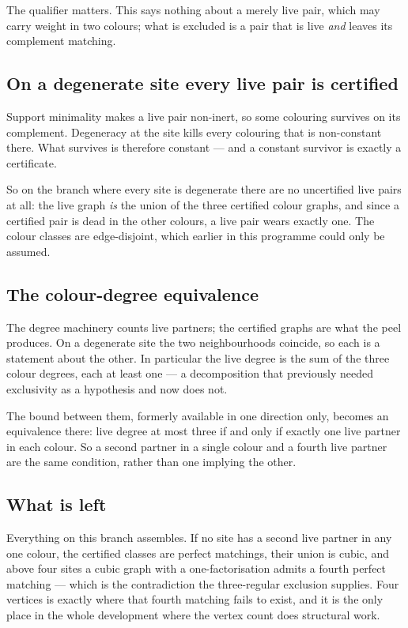 \documentclass[11pt]{article}
\theoremstyle{definition}
\theoremstyle{remark}
\begin{document}
The qualifier matters. This says nothing about a merely live pair, which may carry weight in two
colours; what is excluded is a pair that is live \emph{and} leaves its complement matching.

\subsection*{On a degenerate site every live pair is certified}

Support minimality makes a live pair non-inert, so some colouring survives on its complement.
Degeneracy at the site kills every colouring that is non-constant there. What survives is
therefore constant --- and a constant survivor is exactly a certificate.

So on the branch where every site is degenerate there are no uncertified live pairs at all: the
live graph \emph{is} the union of the three certified colour graphs, and since a certified pair is
dead in the other colours, a live pair wears exactly one. The colour classes are edge-disjoint,
which earlier in this programme could only be assumed.

\subsection*{The colour-degree equivalence}

The degree machinery counts live partners; the certified graphs are what the peel produces. On a
degenerate site the two neighbourhoods coincide, so each is a statement about the other. In
particular the live degree is the sum of the three colour degrees, each at least one --- a
decomposition that previously needed exclusivity as a hypothesis and now does not.

The bound between them, formerly available in one direction only, becomes an equivalence there:
live degree at most three if and only if exactly one live partner in each colour. So a second
partner in a single colour and a fourth live partner are the same condition, rather than one
implying the other.

\subsection*{What is left}

Everything on this branch assembles. If no site has a second live partner in any one colour, the
certified classes are perfect matchings, their union is cubic, and above four sites a cubic graph
with a one-factorisation admits a fourth perfect matching --- which is the contradiction the
three-regular exclusion supplies. Four vertices is exactly where that fourth matching fails to
exist, and it is the only place in the whole development where the vertex count does structural
work.
\end{document}
